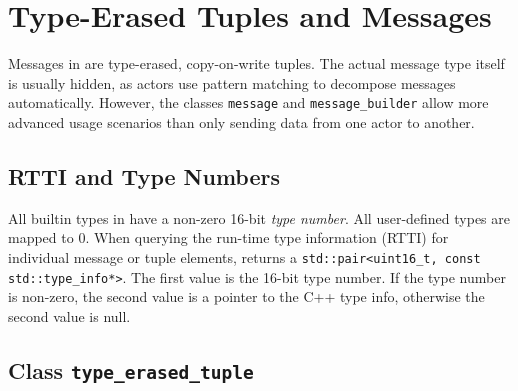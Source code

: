 \section{Type-Erased Tuples and Messages}
\label{message}

Messages in \lib are type-erased, copy-on-write tuples.
The actual message type itself is usually hidden, as actors use pattern matching to decompose messages automatically.
However, the classes \lstinline^message^ and \lstinline^message_builder^ allow more advanced usage scenarios than only sending data from one actor to another.

\subsection{RTTI and Type Numbers}

All builtin types in \lib have a non-zero 16-bit \emph{type number}. All user-defined types are mapped to 0. When querying the run-time type information (RTTI) for individual message or tuple elements, \lib returns a \lstinline^std::pair<uint16_t, const std::type_info*>^. The first value is the 16-bit type number. If the type number is non-zero, the second value is a pointer to the C++ type info, otherwise the second value is null.

\subsection{Class \texttt{type\_erased\_tuple}}

